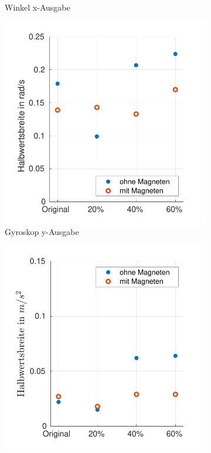 \begin{figure}[tb!]
\begin{adjustwidth}{-0.1\linewidth}{-0.1\linewidth}
\begin{subfigure}[c]{.32\linewidth}
			\caption{Winkel x-Ausgabe}
			\vspace{5pt}
		\end{subfigure}
		\begin{subfigure}[c]{.32\linewidth}
			\centering
			\includegraphics[width=\linewidth]{Bilder/fwhm_GyrY.pdf}
			\caption{Gyroskop y-Ausgabe}
			\vspace{5pt}
		\end{subfigure}
		\hfill
		\begin{subfigure}[c]{.32\linewidth}
			\centering
			\includegraphics[width=\linewidth]{Bilder/fwhm_BeschlY.pdf}

\end{subfigure}
\end{adjustwidth}
\end{figure}
